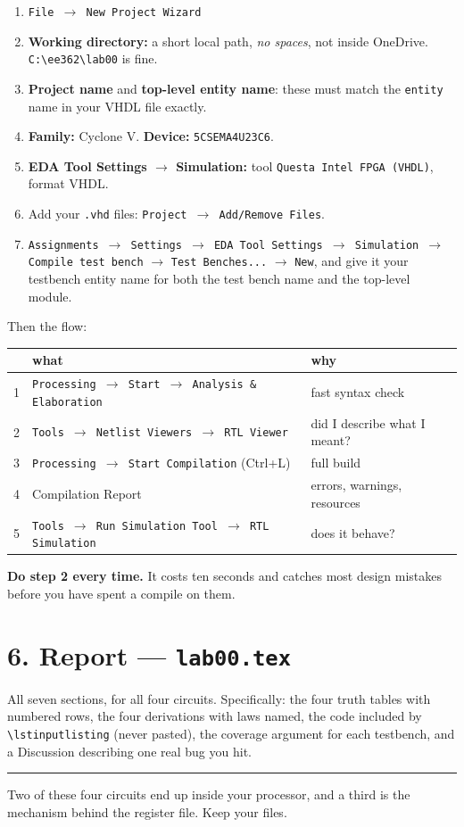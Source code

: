 \documentclass[11pt]{article}
\newcommand{\code}[1]{\texttt{#1}}
\newcommand{\hr}{\vspace{2pt}\hrule\vspace{6pt}}
\begin{document}
\begin{enumerate}[leftmargin=2em,itemsep=2pt]
\item \code{File $\rightarrow$ New Project Wizard}
\item \textbf{Working directory:} a short local path, \emph{no spaces}, not inside
OneDrive. \code{C:\textbackslash ee362\textbackslash lab00} is fine.
\item \textbf{Project name} and \textbf{top-level entity name}: these must match
the \code{entity} name in your VHDL file exactly.
\item \textbf{Family:} Cyclone V. \quad \textbf{Device:} \code{5CSEMA4U23C6}.
\item \textbf{EDA Tool Settings $\rightarrow$ Simulation:} tool
\code{Questa Intel FPGA (VHDL)}, format VHDL.
\item Add your \code{.vhd} files: \code{Project $\rightarrow$ Add/Remove Files}.
\item \code{Assignments $\rightarrow$ Settings $\rightarrow$ EDA Tool Settings
$\rightarrow$ Simulation $\rightarrow$ Compile test bench} $\rightarrow$
\code{Test Benches...} $\rightarrow$ \code{New}, and give it your testbench entity
name for both the test bench name and the top-level module.
\end{enumerate}

Then the flow:

\begin{center}
\begin{tabular}{lll}
\toprule
& what & why \\
\midrule
1 & \code{Processing $\rightarrow$ Start $\rightarrow$ Analysis \& Elaboration} & fast syntax check \\
2 & \code{Tools $\rightarrow$ Netlist Viewers $\rightarrow$ RTL Viewer} & did I describe what I meant? \\
3 & \code{Processing $\rightarrow$ Start Compilation} (Ctrl+L) & full build \\
4 & Compilation Report & errors, warnings, resources \\
5 & \code{Tools $\rightarrow$ Run Simulation Tool $\rightarrow$ RTL Simulation} & does it behave? \\
\bottomrule
\end{tabular}
\end{center}

\textbf{Do step 2 every time.} It costs ten seconds and catches most design
mistakes before you have spent a compile on them.

\section*{6. Report --- \code{lab00.tex}}

All seven sections, for all four circuits. Specifically: the four truth tables
with numbered rows, the four derivations with laws named, the code included by
\code{\textbackslash lstinputlisting} (never pasted), the coverage argument for
each testbench, and a Discussion describing one real bug you hit.

\vspace{10pt}
\hr
{\small Two of these four circuits end up inside your processor, and a third is
the mechanism behind the register file. Keep your files.}
\end{document}
